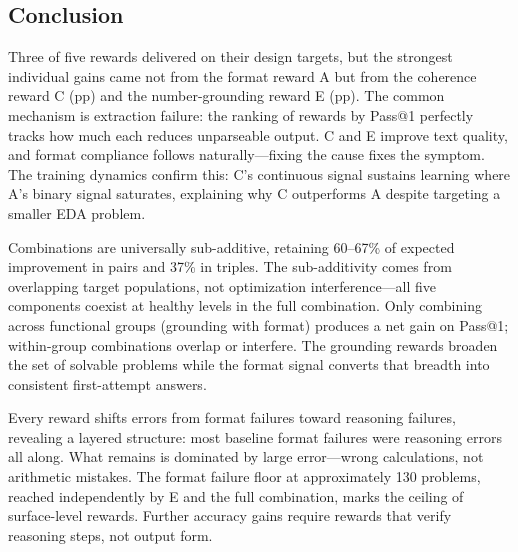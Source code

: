 \subsection{Conclusion}
\nestindent

Three of five rewards delivered on their design targets, but the strongest individual gains came not from the format reward A but from the coherence reward C (\pFourSeparateCDeltaPassOne{}pp) and the number-grounding reward E (\pFourSeparateEDeltaPassOne{}pp).
The common mechanism is extraction failure: the ranking of rewards by Pass@1 perfectly tracks how much each reduces unparseable output.
C and E improve text quality, and format compliance follows naturally---fixing the cause fixes the symptom.
The training dynamics confirm this: C's continuous signal sustains learning where A's binary signal saturates, explaining why C outperforms A despite targeting a smaller EDA problem.

Combinations are universally sub-additive, retaining 60--67\% of expected improvement in pairs and 37\% in triples.
The sub-additivity comes from overlapping target populations, not optimization interference---all five components coexist at healthy levels in the full combination.
Only combining across functional groups (grounding with format) produces a net gain on Pass@1; within-group combinations overlap or interfere.
The grounding rewards broaden the set of solvable problems while the format signal converts that breadth into consistent first-attempt answers.

Every reward shifts errors from format failures toward reasoning failures, revealing a layered structure: most baseline format failures were reasoning errors all along.
What remains is dominated by large error---wrong calculations, not arithmetic mistakes.
The format failure floor at approximately 130 problems, reached independently by E and the full combination, marks the ceiling of surface-level rewards.
Further accuracy gains require rewards that verify reasoning steps, not output form.

\nestunindent
